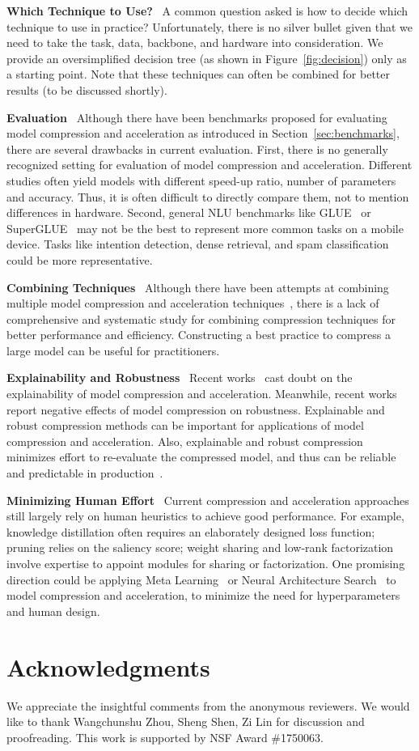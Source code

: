 \documentclass[letterpaper]{article} %
\newcommand{\paratitle}[1]{\noindent\textbf{#1}\ }
\begin{document}
\paratitle{Which Technique to Use?} A common question asked is how to decide which technique to use in practice? Unfortunately, there is no silver bullet given  that we need to take the task, data, backbone, 
and
hardware 
into consideration. We provide an oversimplified decision tree (as shown in Figure~\ref{fig:decision}) only as a starting point.
Note that these techniques can often be combined for better results (to be discussed shortly).

\paratitle{Evaluation} Although there have been benchmarks proposed for evaluating model compression and acceleration as introduced in Section~\ref{sec:benchmarks}, there are several drawbacks in current evaluation. First, there is no generally recognized setting for evaluation of model compression and acceleration. Different studies often yield models with different speed-up ratio, number of parameters and accuracy. Thus, it is often difficult to directly compare them, not to mention differences in hardware. Second, general NLU benchmarks like GLUE~\citep{glue} or SuperGLUE~\citep{superglue} may not be the best to represent more common tasks on a mobile device. Tasks like intention detection, dense retrieval, and spam classification could be more representative.

\paratitle{Combining Techniques} Although there have been attempts at combining multiple model compression and acceleration techniques~\citep{kim2020fastformers,sanh2020movement,xu2021beyond}, there is a lack of comprehensive and systematic study for combining compression techniques for better performance and efficiency. Constructing a best practice to compress a large model can be useful for practitioners.

\paratitle{Explainability and Robustness} Recent works~\citep{stanton2021does,xu2021beyond} cast doubt on the explainability of model compression and acceleration. Meanwhile, recent works~\citep{du2021compressed,xu2021beyond} report negative effects of model compression on robustness. Explainable and robust compression methods can be important for applications of model compression and acceleration. Also, explainable and robust compression minimizes effort to re-evaluate the compressed model, and thus can be reliable and predictable in production~\citep{stanton2021does,xu2021beyond}.

\paratitle{Minimizing Human Effort} Current compression and acceleration approaches still largely rely on human heuristics to achieve good performance. For example, knowledge distillation often requires an elaborately designed loss function; pruning relies on the saliency score; weight sharing and low-rank factorization involve expertise to appoint modules for sharing or factorization. One promising direction could be applying Meta Learning~\citep{maml} or Neural Architecture Search~\citep{darts} to model compression and acceleration, to minimize the need for hyperparameters and human design. 

\section*{Acknowledgments}
We appreciate the insightful comments from the anonymous reviewers. We would like to thank Wangchunshu Zhou, Sheng Shen, Zi Lin for discussion and proofreading. This work is supported by NSF Award \#1750063.


\end{document}
